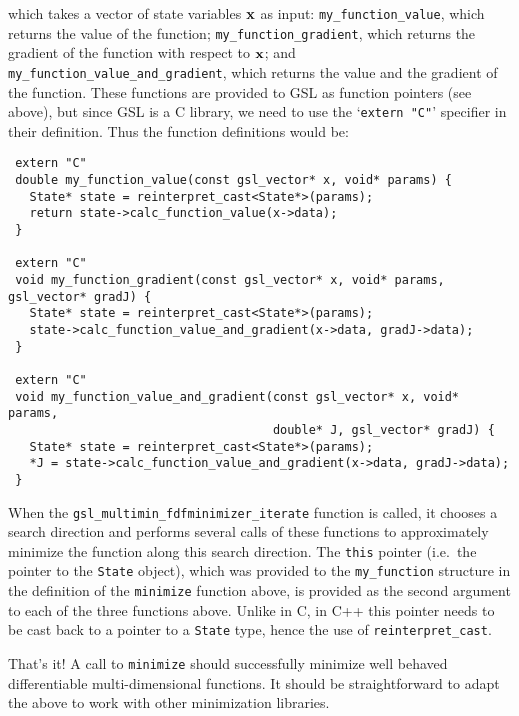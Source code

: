 \documentclass[a4,oneside]{book}
\def\codesize{\small}
\def\x{\ensuremath{{\bf x}}}
\def\code#1{{\codesize\texttt{#1}}}
\begin{document}
which takes a vector of state variables $\x$ as input:
\code{my\_function\_value}, which returns the value of the function;
\code{my\_function\_gradient}, which returns the gradient of the
function with respect to $\x$; and
\code{my\_function\_value\_and\_gradient}, which returns the value and
the gradient of the function. These functions are provided to GSL as
function pointers (see above), but since GSL is a C library, we need
to use the `\code{extern "C"}' specifier in their definition. Thus the
function definitions would be:
%
\begin{lstlisting}
 extern "C" 
 double my_function_value(const gsl_vector* x, void* params) {
   State* state = reinterpret_cast<State*>(params);
   return state->calc_function_value(x->data);
 }

 extern "C"
 void my_function_gradient(const gsl_vector* x, void* params, gsl_vector* gradJ) { 
   State* state = reinterpret_cast<State*>(params);
   state->calc_function_value_and_gradient(x->data, gradJ->data);
 }

 extern "C"
 void my_function_value_and_gradient(const gsl_vector* x, void* params,
                                     double* J, gsl_vector* gradJ) { 
   State* state = reinterpret_cast<State*>(params);
   *J = state->calc_function_value_and_gradient(x->data, gradJ->data);
 }
\end{lstlisting}
%
When the \code{gsl\_multimin\_fdfminimizer\_iterate} function is
called, it chooses a search direction and performs several calls of
these functions to approximately minimize the function along this
search direction. The \code{this} pointer (i.e.\ the pointer to the
\code{State} object), which was provided to the \code{my\_function}
structure in the definition of the \code{minimize} function above, is
provided as the second argument to each of the three functions
above. Unlike in C, in C++ this pointer needs to be cast back to a
pointer to a \code{State} type, hence the use of
\code{reinterpret\_cast}.

That's it! A call to \code{minimize} should successfully minimize well
behaved differentiable multi-dimensional functions.  It should be
straightforward to adapt the above to work with other minimization
libraries.
\end{document}
